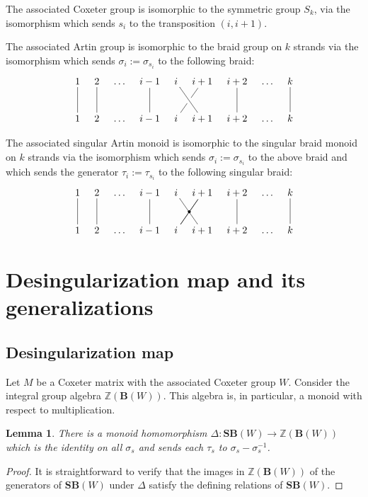 \documentclass[a4paper]{amsart}
\newtheorem{lemma}[theorem]{Lemma}
\begin{document}
The associated Coxeter group is isomorphic to the symmetric group $S_k$,
via the isomorphism which sends $s_i$ to the transposition $(i,i+1)$.

The associated Artin group is isomorphic to the braid group on $k$ strands
via the isomorphism which sends $\sigma_i:=\sigma_{s_i}$ to the following braid:
\begin{displaymath}
\xymatrix@C=3mm{
1\ar@{-}[d]&2\ar@{-}[d]&\dots&i-1\ar@{-}[d]&
i\ar@{-}[dr]&i+1\ar@{-}[dl]|\hole&i+2\ar@{-}[d]&\dots&k\ar@{-}[d]\\
1&2&\dots&i-1&i&i+1&i+2&\dots&k
}
\end{displaymath}

The associated singular Artin monoid is isomorphic to the singular braid monoid on $k$ 
strands via the isomorphism which sends $\sigma_i:=\sigma_{s_i}$ to the above braid
and which sends the generator $\tau_i:=\tau_{s_i}$ to the following singular braid:
\begin{displaymath}
\xymatrix@C=3mm{
1\ar@{-}[d]&2\ar@{-}[d]&\dots&i-1\ar@{-}[d]&
i\ar@{-}[dr]&i+1\ar@{-}[dl]|-{\bullet}\ar@{-}[dl]&i+2\ar@{-}[d]&\dots&k\ar@{-}[d]\\
1&2&\dots&i-1&i&i+1&i+2&\dots&k
}
\end{displaymath}


\section{Desingularization map and its generalizations}\label{s3}

\subsection{Desingularization map}\label{s3.1}

Let $M$ be a Coxeter matrix with the associated Coxeter group $W$. 
Consider the integral group algebra 
$\mathbb{Z}(\mathbf{B}(W))$. This algebra is, in particular, a
monoid with respect to multiplication.

\begin{lemma}\label{lem1}
There is a monoid homomorphism $\Delta:\mathbf{SB}(W)\to \mathbb{Z}(\mathbf{B}(W))$ 
which is the identity on all $\sigma_s$ and sends each $\tau_s$
to $\sigma_s-\sigma_s^{-1}$.
\end{lemma}

\begin{proof}
It is straightforward to verify that the images in $\mathbb{Z}(\mathbf{B}(W))$ 
of the generators of $\mathbf{SB}(W)$ under $\Delta$ satisfy the defining
relations of $\mathbf{SB}(W)$.
\end{proof}
\end{document}
